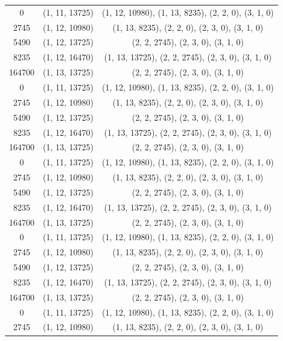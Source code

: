 \begin{small}
\begin{longtable}{ccc}
		0      & (1, 11, 13725) & (1, 12, 10980), (1, 13, 8235), (2, 2, 0), (3, 1, 0) \\
		2745   & (1, 12, 10980) & (1, 13, 8235), (2, 2, 0), (2, 3, 0), (3, 1, 0) \\
		5490   & (1, 12, 13725) & (2, 2, 2745), (2, 3, 0), (3, 1, 0) \\
		8235   & (1, 12, 16470) & (1, 13, 13725), (2, 2, 2745), (2, 3, 0), (3, 1, 0) \\
		164700 & (1, 13, 13725) & (2, 2, 2745), (2, 3, 0), (3, 1, 0) \\
		0      & (1, 11, 13725) & (1, 12, 10980), (1, 13, 8235), (2, 2, 0), (3, 1, 0) \\
		2745   & (1, 12, 10980) & (1, 13, 8235), (2, 2, 0), (2, 3, 0), (3, 1, 0) \\
		5490   & (1, 12, 13725) & (2, 2, 2745), (2, 3, 0), (3, 1, 0) \\
		8235   & (1, 12, 16470) & (1, 13, 13725), (2, 2, 2745), (2, 3, 0), (3, 1, 0) \\
		164700 & (1, 13, 13725) & (2, 2, 2745), (2, 3, 0), (3, 1, 0) \\
		0      & (1, 11, 13725) & (1, 12, 10980), (1, 13, 8235), (2, 2, 0), (3, 1, 0) \\
		2745   & (1, 12, 10980) & (1, 13, 8235), (2, 2, 0), (2, 3, 0), (3, 1, 0) \\
		5490   & (1, 12, 13725) & (2, 2, 2745), (2, 3, 0), (3, 1, 0) \\
		8235   & (1, 12, 16470) & (1, 13, 13725), (2, 2, 2745), (2, 3, 0), (3, 1, 0) \\
		164700 & (1, 13, 13725) & (2, 2, 2745), (2, 3, 0), (3, 1, 0) \\
		0      & (1, 11, 13725) & (1, 12, 10980), (1, 13, 8235), (2, 2, 0), (3, 1, 0) \\
		2745   & (1, 12, 10980) & (1, 13, 8235), (2, 2, 0), (2, 3, 0), (3, 1, 0) \\
		5490   & (1, 12, 13725) & (2, 2, 2745), (2, 3, 0), (3, 1, 0) \\
		8235   & (1, 12, 16470) & (1, 13, 13725), (2, 2, 2745), (2, 3, 0), (3, 1, 0) \\
		164700 & (1, 13, 13725) & (2, 2, 2745), (2, 3, 0), (3, 1, 0) \\
		0      & (1, 11, 13725) & (1, 12, 10980), (1, 13, 8235), (2, 2, 0), (3, 1, 0) \\
		2745   & (1, 12, 10980) & (1, 13, 8235), (2, 2, 0), (2, 3, 0), (3, 1, 0) \\

\end{longtable}
\end{small}
